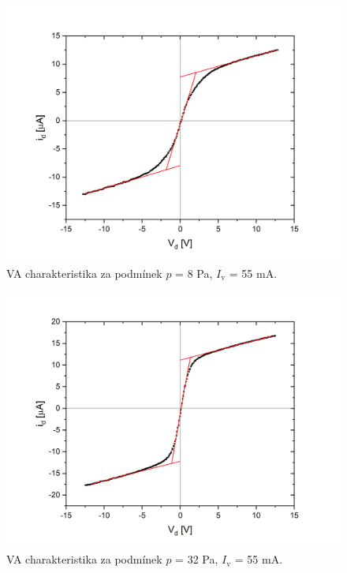\documentclass[a4paper,12pt]{article}
\begin{document}
\begin{figure}[h!]
	\centering
	\includegraphics[width=130mm]{dvojna1.png}
	\caption{VA charakteristika za podmínek $p$ = 8 \si{\pascal}, $I_\text{{v}}$ = 55 \si{\milli\ampere}.}
	\label{dvojna1}
\end{figure}

\begin{figure}[h!]
	\centering
	\includegraphics[width=130mm]{dvojna2.png}
	\caption{VA charakteristika za podmínek $p$ = 32 \si{\pascal}, $I_\text{{v}}$ = 55 \si{\milli\ampere}.}
	\label{dvojna2}
\end{figure}
\end{document}
